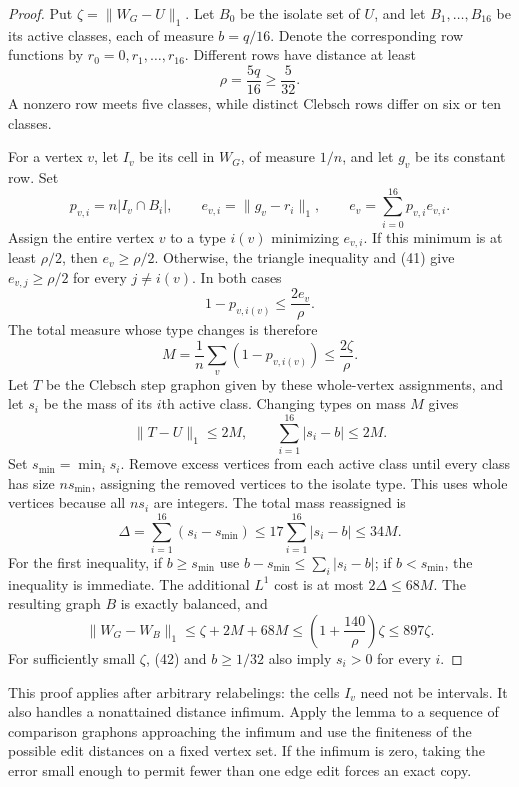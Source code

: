 \begin{proof}
Put $\zeta=\|W_G-U\|_1$. Let $B_0$ be the isolate set of $U$, and let
$B_1,\ldots,B_{16}$ be its active classes, each of measure $b=q/16$.
Denote the corresponding row functions by $r_0=0,r_1,\ldots,r_{16}$.
Different rows have distance at least
\begin{equation}\tag{41}\label{eq:41}
 \rho=\frac{5q}{16}\geq\frac5{32}.
\end{equation}
A nonzero row meets five classes, while distinct Clebsch rows differ on six
or ten classes.

For a vertex $v$, let $I_v$ be its cell in $W_G$, of measure $1/n$, and let
$g_v$ be its constant row. Set
\[
 p_{v,i}=n|I_v\cap B_i|,\qquad
 e_{v,i}=\|g_v-r_i\|_1,\qquad
 e_v=\sum_{i=0}^{16}p_{v,i}e_{v,i}.
\]
Assign the entire vertex $v$ to a type $i(v)$ minimizing $e_{v,i}$. If this
minimum is at least $\rho/2$, then $e_v\geq\rho/2$. Otherwise, the triangle
inequality and (41) give $e_{v,j}\geq\rho/2$ for every $j\ne i(v)$. In both
cases
\[
 1-p_{v,i(v)}\leq\frac{2e_v}{\rho}.
\]
The total measure whose type changes is therefore
\begin{equation}\tag{42}\label{eq:42}
 M=\frac1n\sum_v(1-p_{v,i(v)})\leq\frac{2\zeta}{\rho}.
\end{equation}
Let $T$ be the Clebsch step graphon given by these whole-vertex assignments,
and let $s_i$ be the mass of its $i$th active class. Changing types on mass
$M$ gives
\[
 \|T-U\|_1\leq2M,\qquad\sum_{i=1}^{16}|s_i-b|\leq2M.
\]
Set $s_{\min}=\min_i s_i$. Remove excess vertices from each active class
until every class has size $ns_{\min}$, assigning the removed vertices to
the isolate type. This uses whole vertices because all $ns_i$ are integers.
The total mass reassigned is
\[
 \Delta=\sum_{i=1}^{16}(s_i-s_{\min})
 \leq17\sum_{i=1}^{16}|s_i-b|\leq34M.
\]
For the first inequality, if $b\geq s_{\min}$ use
$b-s_{\min}\leq\sum_i|s_i-b|$; if $b<s_{\min}$, the inequality is immediate.
The additional $L^1$ cost is at most $2\Delta\leq68M$. The resulting graph
$B$ is exactly balanced, and
\[
 \|W_G-W_B\|_1\leq\zeta+2M+68M
 \leq\left(1+\frac{140}{\rho}\right)\zeta\leq897\zeta.
\]
For sufficiently small $\zeta$, (42) and $b\geq1/32$ also imply $s_i>0$
for every $i$.
\end{proof}

This proof applies after arbitrary relabelings: the cells $I_v$ need not be
intervals. It also handles a nonattained distance infimum. Apply the lemma
to a sequence of comparison graphons approaching the infimum and use the
finiteness of the possible edit distances on a fixed vertex set. If the
infimum is zero, taking the error small enough to permit fewer than one
edge edit forces an exact copy.


